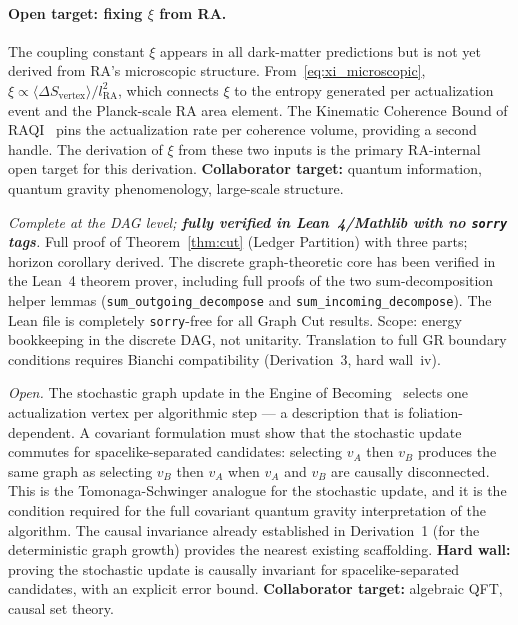 \documentclass[11pt,a4paper]{article}
\theoremstyle{plain}
\theoremstyle{definition}
\theoremstyle{remark}
\begin{document}
\begin{description}
\paragraph{Open target: fixing $\xi$ from RA.}
The coupling constant $\xi$ appears in all dark-matter predictions but is not
yet derived from RA's microscopic structure. From~\eqref{eq:xi_microscopic},
$\xi \propto \langle\Delta S_{\mathrm{vertex}}\rangle / l_{\mathrm{RA}}^2$, which
connects $\xi$ to the entropy generated per actualization event and the
Planck-scale RA area element. The Kinematic Coherence Bound of
RAQI~\citep{Sandeman2026RAQI} pins the actualization rate per coherence volume,
providing a second handle. The derivation of $\xi$ from these two inputs is
the primary RA-internal open target for this derivation.
\textbf{Collaborator target:} quantum information, quantum gravity
phenomenology, large-scale structure.
  \item[Derivation 4 (Graph Cut Theorem).] \textit{Complete at the DAG level;
  \textbf{fully verified in Lean~4/Mathlib with no \texttt{sorry} tags}.}
  Full proof of Theorem~\ref{thm:cut} (Ledger Partition) with three parts; horizon
  corollary derived. The discrete graph-theoretic core has been verified in the
  Lean~4 theorem prover, including full proofs of the two sum-decomposition helper
  lemmas (\texttt{sum\_outgoing\_decompose} and \texttt{sum\_incoming\_decompose}).
  The Lean file is completely \texttt{sorry}-free for all Graph Cut results.
  Scope: energy bookkeeping in the discrete DAG, not unitarity. Translation to
  full GR boundary conditions requires Bianchi compatibility (Derivation~3,
  hard wall~iv).

  \item[Derivation 7 (Covariant Step 4 --- New, from Engine of Becoming).]
  \textit{Open.} The stochastic graph update in the Engine of
  Becoming~\citep{Sandeman2026RAEB} selects one actualization vertex per
  algorithmic step --- a description that is foliation-dependent. A covariant
  formulation must show that the stochastic update commutes for
  spacelike-separated candidates: selecting $v_A$ then $v_B$ produces the same
  graph as selecting $v_B$ then $v_A$ when $v_A$ and $v_B$ are causally
  disconnected. This is the Tomonaga-Schwinger analogue for the stochastic
  update, and it is the condition required for the full covariant quantum
  gravity interpretation of the algorithm. The causal invariance already
  established in Derivation~1 (for the deterministic graph growth) provides the
  nearest existing scaffolding.
  \textbf{Hard wall:} proving the stochastic update is causally invariant for
  spacelike-separated candidates, with an explicit error bound.
  \textbf{Collaborator target:} algebraic QFT, causal set theory.


\end{description}
\end{document}
